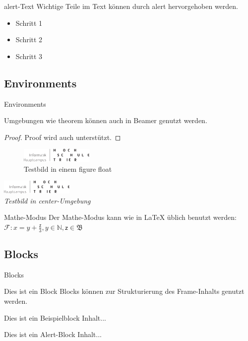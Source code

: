 \documentclass[t,aspectratio=169,dvipsnames]{beamer}
\begin{document}
\begin{frame}{alert-Text}
	Wichtige Teile im Text können \alert<2>{durch alert hervorgehoben} werden.
	\begin{itemize}[<+-|alert@+>]
		\item Schritt 1
		\item Schritt 2
		\item Schritt 3
	\end{itemize}
\end{frame}

\subsection{Environments}
\begin{frame}{Environments}
\begin{theorem}
	Umgebungen wie theorem können auch in Beamer genutzt werden.
\end{theorem}
\begin{proof}
	Proof wird auch unterstützt.
\end{proof}
\begin{figure}
	\includegraphics[width=3.5cm]{HochschuleLogo}
	\caption{Testbild in einem figure float}
\end{figure}
\begin{center}
	\includegraphics[width=3.5cm]{HochschuleLogo}\\
	\emph{Testbild in center-Umgebung}
\end{center}
\end{frame}

\begin{frame}{Mathe-Modus}
	Der Mathe-Modus kann wie in LaTeX üblich benutzt werden:\\ 
	$\mathcal{F}: x = y + \frac{\mathsf{z}}{3}, y \in \mathbb{N}, \mathsf{z} \in \mathfrak{B}$ 
\end{frame}

\subsection{Blocks}
\begin{frame}{Blocks}
\begin{block}{Dies ist ein Block}
	Blocks können zur Strukturierung des Frame-Inhalts genutzt werden.
\end{block}
\begin{exampleblock}{Dies ist ein Beispielblock}
	Inhalt...
\end{exampleblock}
\begin{alertblock}{Dies ist ein Alert-Block}
	Inhalt...
\end{alertblock}
\end{frame}
\end{document}
